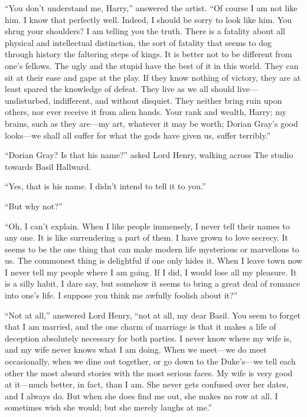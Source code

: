 “You don’t understand me, Harry,” answered the artist. “Of course I am not like him. I know that perfectly well. Indeed, I should be sorry to look like him. You shrug your shoulders? I am telling you the truth. There is a fatality about all physical and intellectual distinction, the sort of fatality that seems to dog through history the faltering steps of kings. It is better not to be different from one’s fellows. The ugly and the stupid have the best of it in this world. They can sit at their ease and gape at the play. If they know nothing of victory, they are at least spared the knowledge of defeat. They live as we all should live—undisturbed, indifferent, and without disquiet. They neither bring ruin upon others, nor ever receive it from alien hands. Your rank and wealth, Harry; my brains, such as they are—my art, whatever it may be worth; Dorian Gray’s good looks—we shall all suffer for what the gods have given us, suffer terribly.”

“Dorian Gray? Is that his name?” asked Lord Henry, walking across The studio towards Basil Hallward.

“Yes, that is his name. I didn’t intend to tell it to you.”

“But why not?”

“Oh, I can’t explain. When I like people immensely, I never tell their names to any one. It is like surrendering a part of them. I have grown to love secrecy. It seems to be the one thing that can make modern life mysterious or marvellous to us. The commonest thing is delightful if one only hides it. When I leave town now I never tell my people where I am going. If I did, I would lose all my pleasure. It is a silly habit, I dare say, but somehow it seems to bring a great deal of romance into one’s life. I suppose you think me awfully foolish about it?”

“Not at all,” answered Lord Henry, “not at all, my dear Basil. You seem to forget that I am married, and the one charm of marriage is that it makes a life of deception absolutely necessary for both parties. I never know where my wife is, and my wife never knows what I am doing. When we meet—we do meet occasionally, when we dine out together, or go down to the Duke’s—we tell each other the most absurd stories with the most serious faces. My wife is very good at it—much better, in fact, than I am. She never gets confused over her dates, and I always do. But when she does find me out, she makes no row at all. I sometimes wish she would; but she merely laughs at me.”

